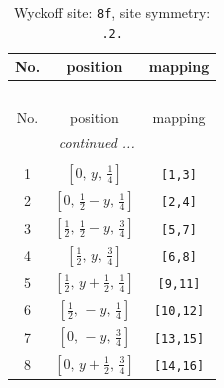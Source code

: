 \documentclass[fleqn,8pt]{jsarticle}
\begin{document}
\begin{longtable}{ccc}
\caption{Wyckoff site: {\tt 8f}, site symmetry: {\tt .2.}}
 \\
 \hline \hline
No. & position & mapping \\ \hline \endfirsthead

\multicolumn{2}{l}{\tablename\ \thetable{}} \\
 \hline \hline
No. & position & mapping \\ \hline \endhead

 \hline \hline
\multicolumn{2}{r}{\footnotesize\it continued ...} \\ \endfoot

 \hline \hline
\multicolumn{2}{r}{} \\ \endlastfoot

1 & $\left[ 0,\, y,\, \frac{1}{4} \right]$ & {\tt [1,3]} \\ \hline
2 & $\left[ 0,\, \frac{1}{2} - y,\, \frac{1}{4} \right]$ & {\tt [2,4]} \\ \hline
3 & $\left[ \frac{1}{2},\, \frac{1}{2} - y,\, \frac{3}{4} \right]$ & {\tt [5,7]} \\ \hline
4 & $\left[ \frac{1}{2},\, y,\, \frac{3}{4} \right]$ & {\tt [6,8]} \\ \hline
5 & $\left[ \frac{1}{2},\, y + \frac{1}{2},\, \frac{1}{4} \right]$ & {\tt [9,11]} \\ \hline
6 & $\left[ \frac{1}{2},\, - y,\, \frac{1}{4} \right]$ & {\tt [10,12]} \\ \hline
7 & $\left[ 0,\, - y,\, \frac{3}{4} \right]$ & {\tt [13,15]} \\ \hline
8 & $\left[ 0,\, y + \frac{1}{2},\, \frac{3}{4} \right]$ & {\tt [14,16]} \\
\end{longtable}
\renewcommand{\arraystretch}{1.2}
\end{document}
